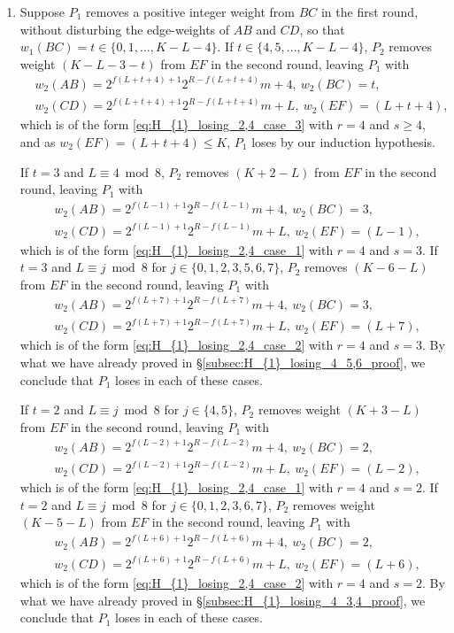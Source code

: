 \documentclass[11pt,reqno]{amsart}
\theoremstyle{definition}
\theoremstyle{definition}
\begin{document}
\begin{enumerate}
\item Suppose $P_{1}$ removes a positive integer weight from $BC$ in the first round, without disturbing the edge-weights of $AB$ and $CD$, so that $w_{1}(BC)=t\in\{0,1,\ldots,K-L-4\}$. If $t\in\{4,5,\ldots,K-L-4\}$, $P_{2}$ removes weight $(K-L-3-t)$ from $EF$ in the second round, leaving $P_{1}$ with
\begin{align}
{}&w_{2}(AB)=2^{f(L+t+4)+1}2^{R-f(L+t+4)}m+4,\ w_{2}(BC)=t,\nonumber\\
{}&w_{2}(CD)=2^{f(L+t+4)+1}2^{R-f(L+t+4)}m+L,\ w_{2}(EF)=(L+t+4),\nonumber
\end{align}
which is of the form \eqref{eq:H_{1}_losing_2,4_case_3} with $r=4$ and $s\geqslant 4$, and as $w_{2}(EF)=(L+t+4)\leqslant K$, $P_{1}$ loses by our induction hypothesis. 

If $t=3$ and $L\equiv 4 \bmod 8$, $P_{2}$ removes $(K+2-L)$ from $EF$ in the second round, leaving $P_{1}$ with
\begin{align}
{}&w_{2}(AB)=2^{f(L-1)+1}2^{R-f(L-1)}m+4,\ w_{2}(BC)=3,\nonumber\\
{}&w_{2}(CD)=2^{f(L-1)+1}2^{R-f(L-1)}m+L,\ w_{2}(EF)=(L-1),\nonumber
\end{align}
which is of the form \eqref{eq:H_{1}_losing_2,4_case_1} with $r=4$ and $s=3$. If $t=3$ and $L \equiv j \bmod 8$ for $j \in \{0,1,2,3,5,6,7\}$, $P_{2}$ removes $(K-6-L)$ from $EF$ in the second round, leaving $P_{1}$ with
\begin{align}
{}&w_{2}(AB)=2^{f(L+7)+1}2^{R-f(L+7)}m+4,\ w_{2}(BC)=3,\nonumber\\
{}&w_{2}(CD)=2^{f(L+7)+1}2^{R-f(L+7)}m+L,\ w_{2}(EF)=(L+7),\nonumber
\end{align}
which is of the form \eqref{eq:H_{1}_losing_2,4_case_2} with $r=4$ and $s=3$. By what we have already proved in \S\ref{subsec:H_{1}_losing_4_5,6_proof}, we conclude that $P_{1}$ loses in each of these cases.

If $t=2$ and $L \equiv j \bmod 8$ for $j \in \{4,5\}$, $P_{2}$ removes weight $(K+3-L)$ from $EF$ in the second round, leaving $P_{1}$ with
\begin{align}
{}&w_{2}(AB)=2^{f(L-2)+1}2^{R-f(L-2)}m+4,\ w_{2}(BC)=2,\nonumber\\
{}&w_{2}(CD)=2^{f(L-2)+1}2^{R-f(L-2)}m+L,\ w_{2}(EF)=(L-2),\nonumber
\end{align}
which is of the form \eqref{eq:H_{1}_losing_2,4_case_1} with $r=4$ and $s=2$. If $t=2$ and $L \equiv j \bmod 8$ for $j \in \{0,1,2,3,6,7\}$, $P_{2}$ removes weight $(K-5-L)$ from $EF$ in the second round, leaving $P_{1}$ with
\begin{align}
{}&w_{2}(AB)=2^{f(L+6)+1}2^{R-f(L+6)}m+4,\ w_{2}(BC)=2,\nonumber\\
{}&w_{2}(CD)=2^{f(L+6)+1}2^{R-f(L+6)}m+L,\ w_{2}(EF)=(L+6),\nonumber
\end{align}
which is of the form \eqref{eq:H_{1}_losing_2,4_case_2} with $r=4$ and $s=2$. By what we have already proved in \S\ref{subsec:H_{1}_losing_4_3,4_proof}, we conclude that $P_{1}$ loses in each of these cases.


\end{enumerate}
\end{document}
